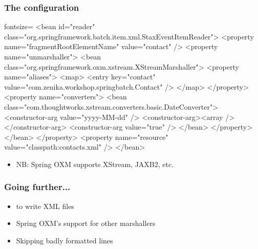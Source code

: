 \begin{frame}[fragile]
 \frametitle{The  configuration}

\begin{xmlcode*}{fontsize=\tiny}
<bean id="reader" class="org.springframework.batch.item.xml.StaxEventItemReader">
  <property name="fragmentRootElementName" value="contact" />
  <property name="unmarshaller">
    <bean class="org.springframework.oxm.xstream.XStreamMarshaller">
      <property name="aliases">
        <map>
          <entry key="contact" value="com.zenika.workshop.springbatch.Contact" />
        </map>
      </property>
      <property name="converters">
        <bean class="com.thoughtworks.xstream.converters.basic.DateConverter">
          <constructor-arg value="yyyy-MM-dd" />
          <constructor-arg><array /></constructor-arg>
          <constructor-arg value="true" />
        </bean>
      </property>
    </bean>
  </property>
  <property name="resource" value="classpath:contacts.xml" />
</bean>
\end{xmlcode*}
  \begin{itemize}
    \item NB: Spring OXM supports XStream, JAXB2, etc. 
  \end{itemize}
\end{frame}

\begin{frame}
 \frametitle{Going further...}
 \begin{itemize}
  \item {} to write XML files
  \item Spring OXM's support for other marshallers
  \item Skipping badly formatted lines
 \end{itemize}
\end{frame}
